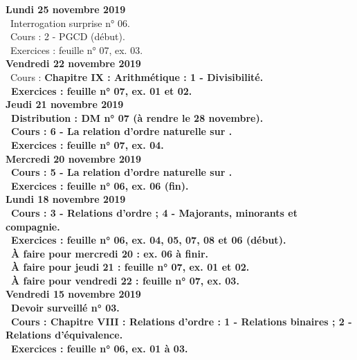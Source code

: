 \documentclass[12pt,a4paper]{article}
\begin{document}
\noindent\textbf{Lundi 25 novembre 2019}\\
\bu\ Interrogation surprise n° 06.\\
\bu\ Cours : 2 - PGCD (début).\\
\bu\ Exercices : feuille n° 07, ex. 03.\vspace{.4cm}\\ 

\noindent\textbf{Vendredi 22 novembre 2019}\\
\bu\ Cours : \bf Chapitre IX \rm : Arithmétique : 1 - Divisibilité.\\
\bu\ Exercices : feuille n° 07, ex. 01 et 02.\vspace{.4cm}\\ 

\noindent\textbf{Jeudi 21 novembre 2019}\\
\bu\ Distribution : DM n° 07 (à rendre le 28 novembre).\\
\bu\ Cours : 6 - La relation d'ordre naturelle sur \R.\\
\bu\ Exercices : feuille n° 07, ex. 04.\vspace{.4cm}\\ 

\noindent\textbf{\bf Mercredi 20 novembre 2019}\\
\bu\ Cours : 5 - La relation d'ordre naturelle sur \N.\\
\bu\ Exercices : feuille n° 06, ex. 06 (fin).\vspace{.4cm}\\ 

\noindent\textbf{Lundi 18 novembre 2019}\\
\bu\ Cours : 3 - Relations d'ordre ;  4 - Majorants, minorants et compagnie.\\
\bu\ Exercices : feuille n° 06, ex. 04, 05, 07, 08 et 06 (début).\\ 
\bu\ À faire pour mercredi 20 : ex. 06 à finir.\\
\bu\ À faire pour jeudi 21 : feuille n° 07, ex. 01 et 02.\\
\bu\ À faire pour vendredi 22 : feuille n° 07, ex. 03.\vspace{.4cm}\\

\noindent\textbf{Vendredi 15 novembre 2019}\\
\bu\ Devoir surveillé n° 03.\\
\bu\ Cours : \bf Chapitre VIII \rm : Relations d'ordre : 1 - Relations binaires ; 2 - Relations d'équivalence.\\
\bu\ Exercices : feuille n° 06, ex. 01 à 03.\vspace{.4cm}\\
\end{document}
